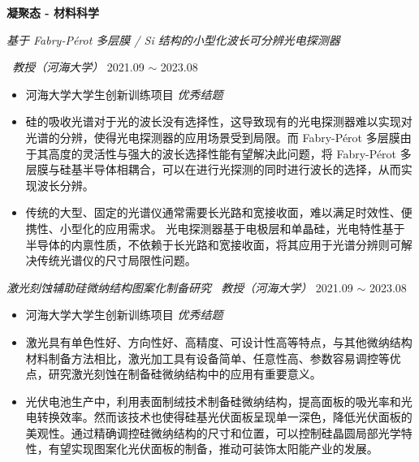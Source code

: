 \documentclass[12pt]{article}
\renewcommand*{\section}[1]{
    ~\\ \noindent \textbf{#1} \medskip \hrule \medskip
}
\begin{document}
\medskip \textbf{凝聚态 - 材料科学}

\smallskip \quad \textit{基于 Fabry-P\'{e}rot 多层膜 / Si 结构的小型化波长可分辨光电探测器}

\hfill \textit{\ 教授（河海大学）} 2021.09 $\sim$ 2023.08

\begin{itemize}
    \item 河海大学大学生创新训练项目 \textit{优秀结题}
    \item 硅的吸收光谱对于光的波长没有选择性，这导致现有的光电探测器难以实现对光谱的分辨，使得光电探测器的应用场景受到局限。而 Fabry-P\'{e}rot 多层膜由于其高度的灵活性与强大的波长选择性能有望解决此问题，将 Fabry-P\'{e}rot 多层膜与硅基半导体相耦合，可以在进行光探测的同时进行波长的选择，从而实现波长分辨。
    \item 传统的大型、固定的光谱仪通常需要长光路和宽接收面，难以满足时效性、便携性、小型化的应用需求。 光电探测器基于电极层和单晶硅，光电特性基于半导体的内禀性质，不依赖于长光路和宽接收面，将其应用于光谱分辨则可解决传统光谱仪的尺寸局限性问题。
\end{itemize}

\smallskip \quad \textit{激光刻蚀辅助硅微纳结构图案化制备研究 \hfill {}\ 教授（河海大学）} 2021.09 $\sim$ 2023.08

\begin{itemize}
    \item 河海大学大学生创新训练项目 \textit{优秀结题}
    \item 激光具有单色性好、方向性好、高精度、可设计性高等特点，与其他微纳结构材料制备方法相比，激光加工具有设备简单、任意性高、参数容易调控等优点，研究激光刻蚀在制备硅微纳结构中的应用有重要意义。
    \item 光伏电池生产中，利用表面制绒技术制备硅微纳结构，提高面板的吸光率和光电转换效率。然而该技术也使得硅基光伏面板呈现单一深色，降低光伏面板的美观性。通过精确调控硅微纳结构的尺寸和位置，可以控制硅晶圆局部光学特性，有望实现图案化光伏面板的制备，推动可装饰太阳能产业的发展。
\end{itemize}



\end{document}
